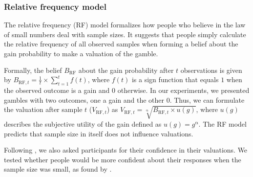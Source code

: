 \documentclass[a4paper, man, natbib, floatsintext]{apa6} %
\begin{document}
\subsubsection{Relative frequency model}

The relative frequency (RF) model formalizes how people who believe in the law of small numbers deal with sample sizes. It suggests that people simply calculate the relative frequency of all observed samples when forming a belief about the gain probability to make a valuation of the gamble. 

Formally, the belief ${B}_{\mathrm{RF}}$ about the gain probability after $t$ observations is given by ${B}_{\mathrm{RF}, t}  =  \frac{1}{t} \times \sum\limits_{t=1}^t f(t)$, where $f(t)$ is a sign function that equals $1$ when the observed outcome is a gain and 0 otherwise. In our experiments, we presented gambles with two outcomes, one a gain and the other 0. Thus, we can formulate the valuation after sample $t$ ($V_{\mathrm{RF}, t}$) as $V_{\mathrm{RF}, t} = \sqrt[\mathrm{\alpha}]{{B}_{\mathrm{RF}, t} \times u({g})}$, where $u(g)$ describes the subjective utility of the gain defined as $u(g) = g^{\mathrm{\alpha}}$. The RF model predicts that sample size in itself does not influence valuations.

Following \cite{Griffin1992}, we also asked participants for their confidence in their valuations. We tested whether people would be more confident about their responses when the sample size was small, as found by \cite{Griffin1992}. 
\end{document}
